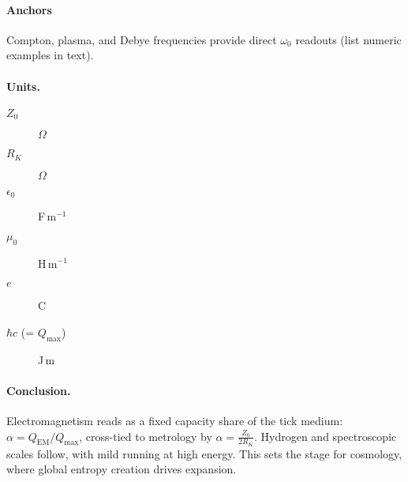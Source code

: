 \paragraph{Anchors}
Compton, plasma, and Debye frequencies provide direct \(\omega_0\) readouts (list numeric examples in text).

\paragraph{Units.}
\begin{description}
\item[$Z_0$] $\Omega$ \quad \item[$R_K$] $\Omega$
\item[$\epsilon_0$] F\,m$^{-1}$ \quad \item[$\mu_0$] H\,m$^{-1}$
\item[$e$] C \quad \item[$\hbar c$ (= $Q_{\max}$)] J\,m
\end{description}

\paragraph{Conclusion.}
Electromagnetism reads as a fixed capacity share of the tick medium: $\alpha=Q_{\mathrm{EM}}/Q_{\max}$, cross-tied to metrology by $\alpha=\tfrac{Z_0}{2R_K}$. Hydrogen and spectroscopic scales follow, with mild running at high energy. This sets the stage for cosmology, where global entropy creation drives expansion.